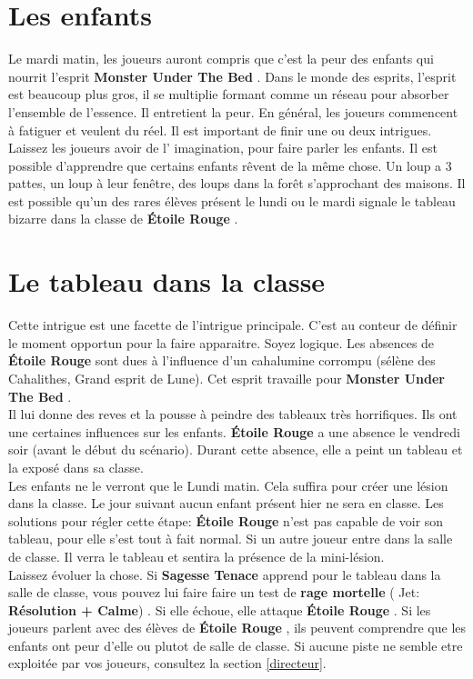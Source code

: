 \documentclass[oneside,12pt]{book}
\newcommand\roll[1]{
( Jet: \textbf{#1})
}
\newcommand{\Lynn}{\textbf{Étoile Rouge} }
\newcommand{\Jessica}{\textbf{Sagesse Tenace} }
\newcommand{\Monster}{\textbf{Monster Under The Bed} }
\begin{document}
\begin{flushleft}
\section{Les enfants}
Le mardi matin, les joueurs auront compris que c'est la peur des enfants qui nourrit l'esprit \Monster.
Dans le monde des esprits, l'esprit est beaucoup plus gros, il se multiplie formant comme un réseau pour absorber l'ensemble de l'essence. Il entretient la peur. En général, les joueurs commencent à fatiguer et veulent du réel. Il est important de finir une ou deux intrigues. Laissez les joueurs avoir de l' imagination, pour faire parler les enfants. Il est possible d'apprendre que certains enfants rêvent de la même chose. 
Un loup a 3 pattes, un loup à leur fenêtre, des loups dans la forêt s'approchant des maisons. Il est possible qu'un des rares élèves présent le lundi ou le mardi signale le tableau bizarre dans la classe de \Lynn . 

\section{Le tableau dans la classe}
Cette intrigue est une facette de l'intrigue principale. C'est au conteur de définir le moment opportun pour la faire apparaitre. Soyez logique. 
Les absences de \Lynn sont dues à l'influence d'un cahalumine corrompu (sélène des Cahalithes, Grand esprit de Lune). Cet esprit travaille pour \Monster. \\
Il lui donne des reves et la pousse à peindre des tableaux très horrifiques. Ils ont une certaines influences sur les enfants. \Lynn a une absence le vendredi soir (avant le début du scénario). 
Durant cette absence, elle a peint un tableau et la exposé dans sa classe. \\
Les enfants ne le verront que le Lundi matin. Cela suffira pour créer une lésion dans la classe. Le jour suivant aucun enfant présent hier ne sera en classe. 
Les solutions pour régler cette étape:
\Lynn n'est pas capable de voir son tableau, pour elle s'est tout à fait normal. Si un autre joueur entre dans la salle de classe. Il verra le tableau et sentira la présence de la mini-lésion.  \\
Laissez évoluer la chose. Si \Jessica apprend pour le tableau dans la salle de classe, vous pouvez lui faire faire un test de \textbf{rage mortelle} \roll{Résolution + Calme}. Si elle échoue, elle attaque \Lynn . 
Si les joueurs parlent avec des élèves de \Lynn, ils peuvent comprendre que les enfants ont peur d'elle ou plutot de salle de classe.
Si aucune piste ne semble etre exploitée par vos joueurs, consultez la section \ref{directeur}.




\end{flushleft}
\end{document}
